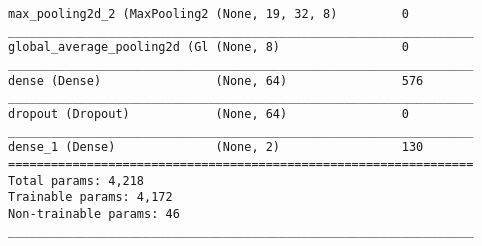 \begin{verbatim}
max_pooling2d_2 (MaxPooling2 (None, 19, 32, 8)         0         
_________________________________________________________________
global_average_pooling2d (Gl (None, 8)                 0         
_________________________________________________________________
dense (Dense)                (None, 64)                576       
_________________________________________________________________
dropout (Dropout)            (None, 64)                0         
_________________________________________________________________
dense_1 (Dense)              (None, 2)                 130       
=================================================================
Total params: 4,218
Trainable params: 4,172
Non-trainable params: 46
_________________________________________________________________
\end{verbatim}

